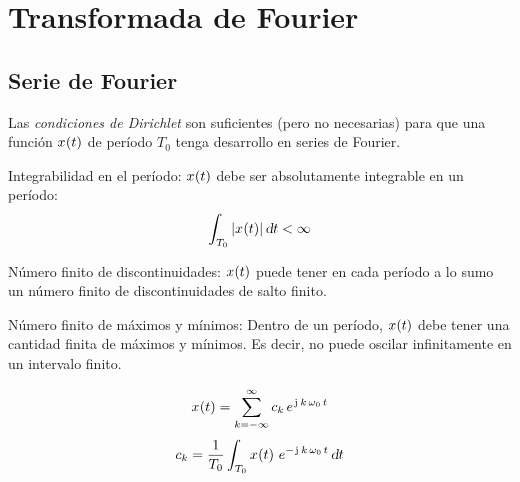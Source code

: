 \chapter{Transformada de Fourier}

\section{Serie de Fourier}

Las \emph{condiciones de Dirichlet} son suficientes (pero no necesarias) para que una función $\fx[x]{t}$ de período $T_0$ tenga desarrollo en series de Fourier.

\begin{numset}
    \begin{numitem}{Integrabilidad en el período:}
        $\fx[x]{t}$ debe ser absolutamente integrable en un período:
        \[
            \int_{T_0} \norm{\fx[x]{t}} \, \dif t < \infty
        \]
    \end{numitem}

    \begin{numitem}{Número finito de discontinuidades:}
        $\fx[x]{t}$ puede tener en cada período a lo sumo un número finito de discontinuidades de salto finito.
    \end{numitem}

    \begin{numitem}{Número finito de máximos y mínimos:}
        Dentro de un período, $\fx[x]{t}$ debe tener una cantidad finita de máximos y mínimos.
        Es decir, no puede oscilar infinitamente en un intervalo finito.
    \end{numitem}
\end{numset}

\begin{mdframed}[style=DefinitionFrame]
    \begin{defn}
        \label{defn:FourierSerieExp}
    \end{defn}
    \[
        \fx[x]{t} = \sum_{\kth=-\infty}^\infty c_\kth \, e^{\iu \, \kth \, \omega_0 \, t}
    \]
    \[
        c_\kth = \frac{1}{T_0} \int_{T_0} \fx[x]{t} \, e^{-\iu \, \kth \, \omega_0 \, t} \, \dif t
    \]
\end{mdframed}

